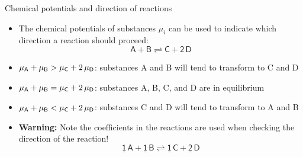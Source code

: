 %
%
\begin{frame}{Chemical potentials and direction of reactions}

\begin{itemize}[<+->]
\item The chemical potentials of substances $\mu_{i}$ can be used to
indicate which direction a reaction should proceed: 
\[
\mathsf{A+B\rightleftharpoons C+2\,D}
\]
\item $\mu_{\sf A}+\mu_{\sf B}>\mu_{\sf C}+2\,\mu_{\sf D}$: substances A and B will
tend to transform to C and D
\item $\mu_{\sf A}+\mu_{\sf B}=\mu_{\sf C}+2\,\mu_{\sf D}$: substances A, B, C,
and D are in equilibrium 
\item $\mu_{\sf A}+\mu_{\sf B}<\mu_{\sf C}+2\,\mu_{\sf D}$: substances C and D will
tend to transform to A and B
\item \alert{\bf Warning:} Note the coefficients in the reactions are used
when checking the direction of the reaction!
\[
\mathsf{\underline{1}\,A+\underline{1}\,B\rightleftharpoons\underline{1}\,C+\underline{2}\,D}
\]
\end{itemize}
\end{frame}
%
%
